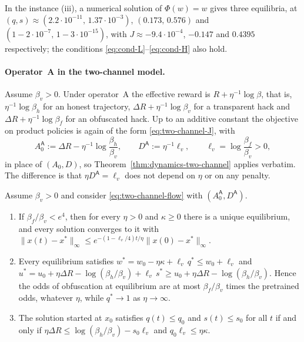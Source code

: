 In the instance (iii), a numerical solution of $\Phi(w)=w$ gives three
equilibria, at $(q,s)\approx(2.2\cdot10^{-11},\,1.37\cdot10^{-3})$,
$(0.173,\,0.576)$ and $(1-2\cdot10^{-7},\,1-3\cdot10^{-15})$, with
$J\approx-9.4\cdot10^{-4}$, $-0.147$ and $0.4395$ respectively; the
conditions \eqref{eq:cond-L}--\eqref{eq:cond-H} also hold.

\paragraph{Operator~A in the two-channel model.}
Assume $\beta_v>0$. Under operator~A the effective reward is
$R+\eta^{-1}\log\beta$, that is, $\eta^{-1}\log\beta_h$ for an honest
trajectory, $\Delta R+\eta^{-1}\log\beta_v$ for a transparent hack and
$\Delta R+\eta^{-1}\log\beta_f$ for an obfuscated hack. Up to an additive
constant the objective on product policies is again of the form
\eqref{eq:two-channel-J}, with
\[
A_0^{\mathsf A}:=\Delta R-\eta^{-1}\log\frac{\beta_h}{\beta_v},\qquad
D^{\mathsf A}:=\eta^{-1}\ell_v,\qquad \ell_v=\log\frac{\beta_f}{\beta_v}>0,
\]
in place of $(A_0,D)$, so Theorem~\ref{thm:dynamics-two-channel} applies
verbatim. The difference is that $\eta D^{\mathsf A}=\ell_v$ does not
depend on $\eta$ or on any penalty.

\begin{proposition}
\label{prop:two-channel-A}
Assume $\beta_v>0$ and consider \eqref{eq:two-channel-flow} with
$(A_0^{\mathsf A},D^{\mathsf A})$.
\begin{enumerate}
\item[\textup{(i)}] If $\beta_f/\beta_v<e^{4}$, then for every $\eta>0$ and
$\kappa\ge0$ there is a unique equilibrium, and every solution converges
to it with
$\|x(t)-x^\ast\|_\infty\le e^{-(1-\ell_v/4)t/\eta}\|x(0)-x^\ast\|_\infty$.
\item[\textup{(ii)}] Every equilibrium satisfies
$w^\ast=w_0-\eta\kappa+\ell_v\,q^\ast\le w_0+\ell_v$ and
$u^\ast=u_0+\eta\Delta R-\log(\beta_h/\beta_v)+\ell_v\,s^\ast
\ge u_0+\eta\Delta R-\log(\beta_h/\beta_v)$. Hence the odds of obfuscation
at equilibrium are at most $\beta_f/\beta_v$ times the pretrained odds,
whatever $\eta$, while $q^\ast\to1$ as $\eta\to\infty$.
\item[\textup{(iii)}] The solution started at $x_0$ satisfies
$q(t)\le q_0$ and $s(t)\le s_0$ for all $t$ if and only if
$\eta\Delta R\le\log(\beta_h/\beta_v)-s_0\ell_v$ and
$q_0\ell_v\le\eta\kappa$.
\end{enumerate}
\end{proposition}

